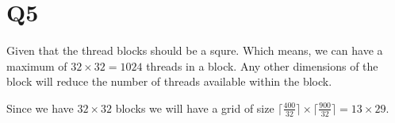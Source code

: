 \documentclass{article}
\begin{document}
\section*{Q5}
Given that the thread blocks should be a squre.  Which means, we can have a maximum of $32 \times 32 = 1024 $ threads in a block.
Any other dimensions of the block will reduce the number of threads available within the block.

Since we have $32 \times 32$ blocks we will have a grid of size $\lceil \frac{400}{32} \rceil \times \lceil \frac{900}{32} \rceil = 13 \times 29 $.
\end{document}
